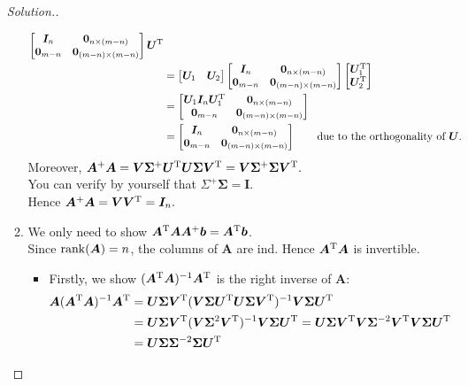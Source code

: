 \begin{enumerate}
\begin{proof}[Solution.]
\begin{enumerate}
\[\begin{aligned}
\begin{bmatrix}
\bm I_{n}&\bm0_{n\times(m-n)}\\\bm0_{m-n}&\bm0_{(m-n)\times(m-n)}
\end{bmatrix}\bm U^{\mathrm T}\\
&=\begin{bmatrix}
\bm U_1&\bm U_2
\end{bmatrix}\begin{bmatrix}
\bm I_{n}&\bm0_{n\times(m-n)}\\\bm0_{m-n}&\bm0_{(m-n)\times(m-n)}
\end{bmatrix}\begin{bmatrix}
\bm U_1^{\mathrm T}\\\bm U_2^{\mathrm T}
\end{bmatrix}\\
&=\begin{bmatrix}
\bm U_1\bm I_{n}\bm U_1^{\mathrm T}&\bm0_{n\times(m-n)}\\\bm0_{m-n}&\bm0_{(m-n)\times(m-n)}
\end{bmatrix}\\
&=\begin{bmatrix}
\bm I_{n}&\bm0_{n\times(m-n)}\\\bm0_{m-n}&\bm0_{(m-n)\times(m-n)}
\end{bmatrix}\qquad\text{due to the orthogonality of $\bm U$.}
\end{aligned}
\]
Moreover, $\bm A^+\bm A=\bm V\bm\Sigma^+\bm U^{\mathrm T}\bm U\bm\Sigma\bm V^{\mathrm T}
=\bm V\bm\Sigma^+\bm\Sigma\bm V^{\mathrm T}.$\\
You can verify by yourself that $\Sigma^+\bm\Sigma=\bm I$.\\
Hence $\bm A^+\bm A=\bm V\bm V^{\mathrm T}=\bm I_{n}.$
\item
We only need to show $\bm A^{\mathrm T}\bm A\bm A^+\bm b=\bm A^{\mathrm T}\bm b$.\\
Since $\operatorname{rank}(\bm A)=n$, the columns of $\bm A$ are ind. Hence $\bm A^{\mathrm T}\bm A$ is invertible.
\begin{itemize}
\item
Firstly, we show $(\bm A^{\mathrm T}\bm A)^{-1}\bm A^{\mathrm T}$ is the right inverse of $\bm A$:
\[
\begin{aligned}
\bm A(\bm A\trans\bm A)^{-1}\bm A\trans&=
\bm U\bm\Sigma\bm V\trans(\bm V\bm\Sigma\bm U\trans\bm U\bm\Sigma\bm V\trans)^{-1}
\bm V\bm\Sigma\bm U\trans\\
&=\bm U\bm\Sigma\bm V\trans(\bm V\bm\Sigma^2\bm V\trans)^{-1}\bm V\bm\Sigma\bm U\trans
=\bm U\bm\Sigma\bm V\trans\bm V\bm\Sigma^{-2}\bm V\trans\bm V\bm\Sigma\bm U\trans\\
&=\bm U\bm\Sigma\bm\Sigma^{-2}\bm\Sigma\bm U\trans\\

\end{aligned}\]
\end{itemize}
\end{enumerate}
\end{proof}
\end{enumerate}
